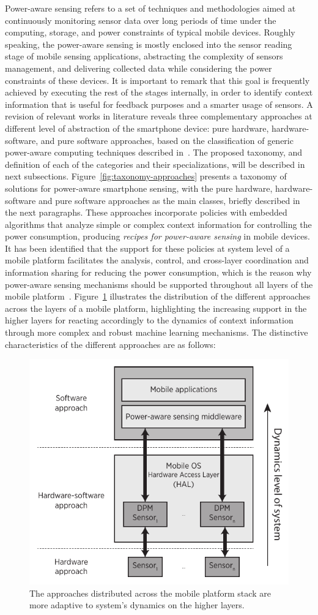 \documentclass[12pt]{article}
\numberwithin{equation}{section}
\numberwithin{table}{section}
\numberwithin{figure}{section}
\begin{document}
Power-aware sensing refers to a set of techniques and methodologies aimed at continuously monitoring sensor data over long periods of time under the computing, storage, and power constraints of typical mobile devices.
Roughly speaking, the power-aware sensing is mostly enclosed into the sensor reading stage of mobile sensing applications, abstracting the complexity of sensors management, and delivering collected data while considering the power constraints of these devices. 
It is important to remark that this goal is frequently achieved by executing the rest of the stages internally, in order to identify context information that is useful for feedback purposes and a smarter usage of sensors.
A revision of relevant works in literature reveals three complementary approaches at different level of abstraction of the smartphone device: pure hardware, hardware-software, and pure software approaches, based on the classification of generic power-aware computing techniques described in~\cite{Ranganathan2010}.
The proposed taxonomy, and definition of each of the categories and their specializations, will be described in next subsections.
Figure~\ref{fig:taxonomy-approaches} presents a taxonomy of solutions for power-aware smartphone sensing, with the pure hardware, hardware-software and pure software approaches as the main classes, briefly described in the next paragraphs.
These approaches incorporate policies with embedded algorithms that analyze simple or complex context information for controlling the power consumption, producing \emph{recipes for power-aware sensing} in mobile devices.
It has been identified that the support for these policies at system level of a mobile platform facilitates the analysis, control, and cross-layer coordination and information sharing for reducing the power consumption, which is the reason why power-aware sensing mechanisms should be supported throughout all layers of the mobile platform~\cite{Ranganathan2010}.
Figure~\ref{fig:distribution-approaches} illustrates the distribution of the different approaches across the layers of a mobile platform, highlighting the increasing support in the higher layers for reacting accordingly to the dynamics of context information through more complex and robust machine learning mechanisms.
The distinctive characteristics of the different approaches are as follows:
\begin{figure}[t]
  \centering
  \includegraphics[width=0.5\columnwidth]{approaches-distribution}
  \caption{The approaches distributed across the mobile platform stack are more adaptive to system's dynamics on the higher layers.}
  \label{fig:distribution-approaches}
\end{figure}
\end{document}
